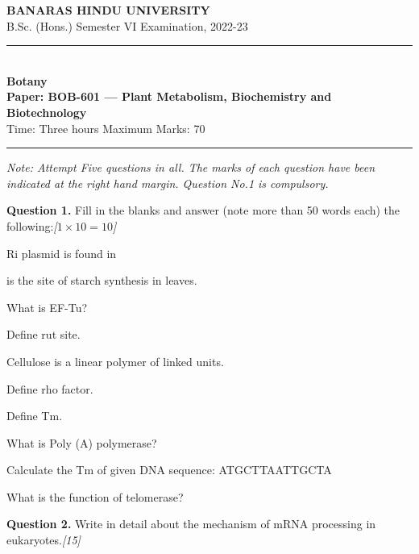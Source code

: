 \documentclass[11pt,a4paper]{article}
\newcommand{\pts}[1]{\hfill   \textit{[#1]}}
\begin{document}
\begin{center}
  {\large\bfseries BANARAS HINDU UNIVERSITY}\\[2pt]
  {\normalsize B.Sc. (Hons.) Semester VI Examination, 2022-23}\\[6pt]
  \rule{0.8\linewidth}{0.5pt}\\[6pt]
  {\large\bfseries Botany}\\[4pt]
  {\large\bfseries Paper: BOB-601 --- Plant Metabolism, Biochemistry and Biotechnology}\\[4pt]
  {\normalsize Time: Three hours \hfill Maximum Marks: 70}
\end{center}

\rule{\linewidth}{0.4pt}

\smallskip



\noindent   \textit{Note: Attempt Five questions in all. The marks of each question have been indicated at the right hand margin. Question No.1 is compulsory.}

\bigskip

\medskip


\noindent   \textbf{Question 1.} Fill in the blanks and answer (note more than 50 words each) the following:\pts{$1  \times 10 = 10$}

\begin{parts}
  \item Ri plasmid is found in \makebox[3cm]{\hrulefill}
  \item \makebox[3cm]{\hrulefill} is the site of starch synthesis in leaves.
  \item What is EF-Tu?
  \item Define rut site.
  \item Cellulose is a linear polymer of \makebox[2cm]{\hrulefill} linked \makebox[2cm]{\hrulefill} units.
  \item Define rho factor.
  \item Define Tm.
  \item What is Poly (A) polymerase?
  \item Calculate the Tm of given DNA sequence: ATGCTTAATTGCTA
  \item What is the function of telomerase?
\end{parts}

\medskip


\noindent   \textbf{Question 2.} Write in detail about the mechanism of mRNA processing in eukaryotes.\pts{15}

\medskip
\end{document}
